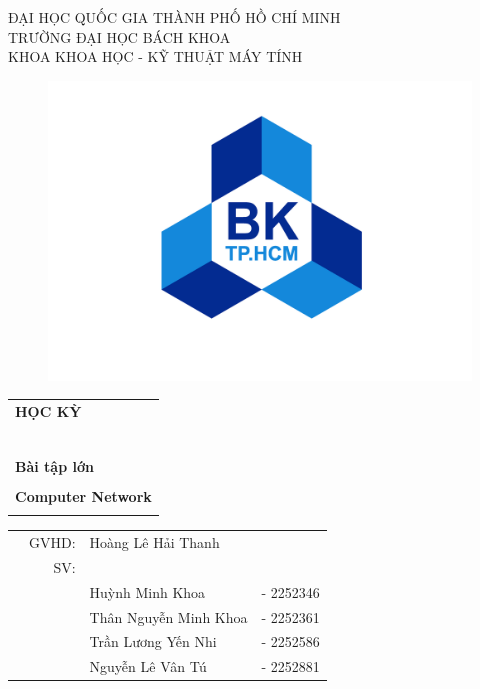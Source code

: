 \documentclass[a4paper]{article}
\begin{document}
\setlength{\parindent}{0.5cm}

\begin{titlepage}
\begin{center}
ĐẠI HỌC QUỐC GIA THÀNH PHỐ HỒ CHÍ MINH \\
TRƯỜNG ĐẠI HỌC BÁCH KHOA \\
KHOA KHOA HỌC - KỸ THUẬT MÁY TÍNH 
\end{center}

\begin{figure}[h!]
\begin{center}
\includegraphics[scale = 0.27]{01_logobachkhoasang.png}
\end{center}
\end{figure}


\begin{center}
\begin{tabular}{c}
	\multicolumn{1}{l}{\textbf{{\Large HỌC KỲ }}}\\
	~~\\
	\hline
	\\
	\multicolumn{1}{l}{\textbf{{\Large Bài tập lớn}}}\\
	\\
	
	\textbf{{\Huge Computer Network}}\\
	\\
	\hline
\end{tabular}
\end{center}

\begin{table}[h]
\begin{tabular}{rrll}
\hspace{2.5 cm} & GVHD: &  Hoàng Lê Hải Thanh\\
& SV: &  &\\
& &   Huỳnh Minh Khoa&- 2252346\\
& &Thân Nguyễn Minh Khoa &- 2252361\\
& & Trần Lương Yến Nhi &- 2252586\\
 & & Nguyễn Lê Vân Tú&- 2252881\\
\end{tabular}
\end{table}


\end{titlepage}
\end{document}
